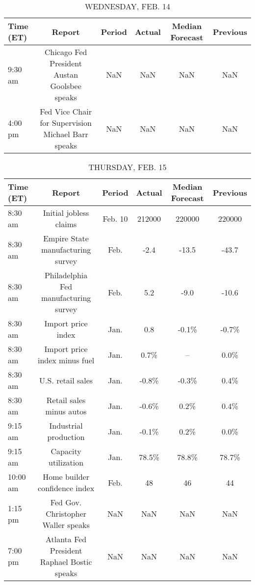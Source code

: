 \documentclass{article}%
\begin{document}
\begin{table}[htbp]%
\caption{WEDNESDAY, FEB. 14}%
\centering%
\begin{adjustbox}{width=1\textwidth}%
\begin{tabular}{lccccc}
\toprule
Time (ET) &                                             Report & Period & Actual & Median Forecast & Previous \\
\midrule
  9:30 am &       Chicago Fed President Austan Goolsbee speaks &    NaN &    NaN &             NaN &      NaN \\
  4:00 pm & Fed Vice Chair for Supervision Michael Barr speaks &    NaN &    NaN &             NaN &      NaN \\
\bottomrule
\end{tabular}
%
\end{adjustbox}%
\end{table}

%


\begin{table}[htbp]%
\caption{THURSDAY, FEB. 15}%
\centering%
\begin{adjustbox}{width=1\textwidth}%
\begin{tabular}{lccccc}
\toprule
Time (ET) &                                      Report &  Period & Actual & Median Forecast & Previous \\
\midrule
  8:30 am &                      Initial jobless claims & Feb. 10 & 212000 &          220000 &   220000 \\
  8:30 am &           Empire State manufacturing survey &    Feb. &   -2.4 &           -13.5 &    -43.7 \\
  8:30 am &       Philadelphia Fed manufacturing survey &    Feb. &    5.2 &            -9.0 &    -10.6 \\
  8:30 am &                          Import price index &    Jan. &    0.8 &           -0.1\% &    -0.7\% \\
  8:30 am &               Import price index minus fuel &    Jan. &   0.7\% &              -- &     0.0\% \\
  8:30 am &                           U.S. retail sales &    Jan. &  -0.8\% &           -0.3\% &     0.4\% \\
  8:30 am &                    Retail sales minus autos &    Jan. &  -0.6\% &            0.2\% &     0.4\% \\
  9:15 am &                       Industrial production &    Jan. &  -0.1\% &            0.2\% &     0.0\% \\
  9:15 am &                        Capacity utilization &    Jan. &  78.5\% &           78.8\% &    78.7\% \\
 10:00 am &               Home builder confidence index &    Feb. &     48 &              46 &       44 \\
  1:15 pm &          Fed Gov. Christopher Waller speaks &     NaN &    NaN &             NaN &      NaN \\
  7:00 pm & Atlanta Fed President Raphael Bostic speaks &     NaN &    NaN &             NaN &      NaN \\
\bottomrule
\end{tabular}
%
\end{adjustbox}%
\end{table}
\end{document}
